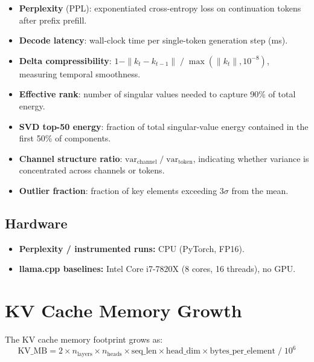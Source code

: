 \documentclass[11pt,a4paper]{article}
\begin{document}
\begin{itemize}[itemsep=1pt]
  \item \textbf{Perplexity} (PPL): exponentiated cross-entropy loss on
        continuation tokens after prefix prefill.
  \item \textbf{Decode latency}: wall-clock time per single-token
        generation step (ms).
  \item \textbf{Delta compressibility}: $1 - \|k_{t} - k_{t-1}\| \;/\;
        \max(\|k_t\|, 10^{-8})$, measuring temporal smoothness.
  \item \textbf{Effective rank}: number of singular values needed to
        capture 90\% of total energy.
  \item \textbf{SVD top-50 energy}: fraction of total singular-value
        energy contained in the first 50\% of components.
  \item \textbf{Channel structure ratio}: $\mathrm{var}_\mathrm{channel}
        \;/\; \mathrm{var}_\mathrm{token}$, indicating whether variance
        is concentrated across channels or tokens.
  \item \textbf{Outlier fraction}: fraction of key elements exceeding
        $3\sigma$ from the mean.
\end{itemize}

\subsection{Hardware}

\begin{itemize}[itemsep=1pt]
  \item \textbf{Perplexity / instrumented runs:} CPU (PyTorch, FP16).
  \item \textbf{llama.cpp baselines:} Intel Core i7-7820X (8 cores,
        16 threads), no GPU.
\end{itemize}

\newpage

\section{KV Cache Memory Growth}

The KV cache memory footprint grows as:
\[
\text{KV\_MB} = 2 \times n_\text{layers} \times n_\text{heads}
               \times \text{seq\_len} \times \text{head\_dim}
               \times \text{bytes\_per\_element} \;/\; 10^6
\]
\end{document}
